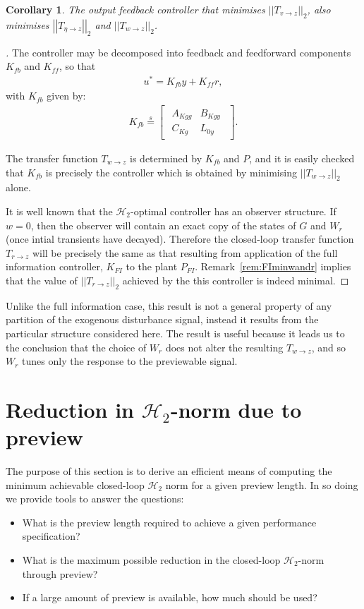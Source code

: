 \documentclass[a4paper,12pt]{article}
\newenvironment{pf}[1][\proofname]
{\begin{proof}[\proofname]}
{\end{proof}}
\newtheorem{cor}[thm]{Corollary}
\theoremstyle{remark}
\newcommand{\arr}[2]{
        \begin{array}{#1}
        #2
        \end{array}}
\newcommand{\shorteq}{\stackrel{s}{=}}
\newcommand{\nrm}[1]{\left|\left| #1 \right|\right|}
\newcommand{\ma}[1]{\begin{bmatrix} #1 \end{bmatrix}}
\newcommand{\als}[1]{\begin{align*} #1 \end{align*}}
\newcommand{\htwo}{\mathcal H_2}
\begin{document}
\begin{cor}
\label{cor:minwandr}
The output feedback controller that minimises $\nrm{T_{v\rightarrow z}}_2$, also minimises $\nrm{T_{\eta\rightarrow z}}_2$ and $\nrm{T_{w\rightarrow z}}_2$.
\end{cor}
\begin{pf}
The controller may be decomposed into feedback and feedforward components $K_{fb}$ and $K_{ff}$, so that 
\als{u^*=K_{fb}y+K_{ff}r,} 
with $K_{fb}$ given by:
\als{
K_{fb}\shorteq \ma{\arr{c|c}{A_{Kgg}&B_{Kgy}\\ \hline C_{Kg} &L_{0y}}}
.}

The transfer function $T_{w\rightarrow z}$ is determined by $K_{fb}$ and $P$, and it is  easily checked that $K_{fb}$ is precisely the controller which is obtained by minimising $\nrm{T_{w\rightarrow z}}_2$ alone.

It is well known that the $\htwo$-optimal controller has an observer structure. If $w=0$, then the observer will contain an exact copy of the states of $G$ and $W_r$ (once intial transients have decayed). Therefore the closed-loop transfer function $T_{r\rightarrow z}$ will be precisely the same as that resulting from application of the full information controller, $K_{FI}$ to the plant $P_{FI}$. Remark~\ref{rem:FIminwandr} implies that the value of $\nrm{T_{r\rightarrow z}}_2$ achieved by the this controller is indeed minimal.
\end{pf}

Unlike the full information case, this result is not a general property of any partition of the exogenous disturbance signal, instead it results from the particular structure considered here. The result is useful because it leads us to the conclusion that the choice of $W_r$ does not alter the resulting  $T_{w\rightarrow z}$, and so $W_r$ tunes only the response to the previewable signal. 










 
\section{Reduction in $\htwo$-norm due to preview}
\label{sec:2norm}
The purpose of this section is to derive an efficient means of computing the minimum achievable closed-loop $\htwo$ norm for a given preview length. In so doing we provide tools to answer the questions: 
\begin{itemize}
\item What is the preview length required to achieve a given performance specification?
\item What is the maximum possible reduction in the closed-loop $\htwo$-norm through preview?
\item If a large amount of preview is available, how much should be used?
\end{itemize}
\end{document}
